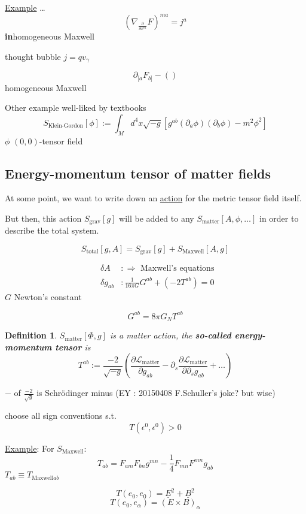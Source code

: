 \documentclass[10pt, twoside]{amsart}
\newtheorem{definition}{Definition}
\begin{document}
\begin{multicols*}{2}
\underline{Example} \dots 
\[
(\nabla_{\frac{ \partial }{ \partial x^m} }F)^{ma} = j^a
\]
\textbf{in}homogeneous Maxwell

thought bubble $j=qv_{\gamma}$

\[
\partial_{[a}F_{b]} - ()
\]
homogeneous Maxwell

Other example well-liked by textbooks
\[
S_{\text{Klein-Gordon}}[\phi] := \int_M d^4x \sqrt{-g}[g^{ab}(\partial_a \phi) (\partial_b \phi ) - m^2\phi^2]
\]
$\phi$ $(0,0)$-tensor field

\subsection{Energy-momentum tensor of matter fields}

At some point, we want to write down an \underline{action} for the metric tensor field itself.

But then, this action $S_{\text{grav}}[g]$ will be added to any $S_{\text{matter}}[A,\phi,\dots]$ in order to describe the total system.  

\[
S_{\text{total}}[g,A] = S_{\text{grav}}[g] + S_{\text{Maxwell}}[A,g]
\]

\[
\begin{aligned}
  & \delta A     & : \Longrightarrow \text{ Maxwell's equations } \\
  & \delta g_{ab} & : \boxed{ \frac{1}{ 16 \pi G } G^{ab} } + (-2T^{ab} ) = 0 
\end{aligned}
\]
$G$ Newton's constant

\[
G^{ab} = 8 \pi G_N T^{ab}
\]

\begin{definition}
$  S_{\text{matter}}[\Phi,g] $ is a matter action, the \textbf{so-called energy-momentum tensor} is 
\[
T^{ab} := \frac{-2}{ \sqrt{-g}} \left( \frac{ \partial \mathcal{L}_{\text{matter}} }{ \partial g_{ab}} - \partial_s \frac{ \partial \mathcal{L}_{\text{matter}} }{ \partial \partial_s g_{ab}} + \dots \right)
\]
\end{definition}
$-$ of $\frac{-2}{\sqrt{g}}$ is Schr\"{o}dinger minus (EY : 20150408 F.Schuller's joke? but wise)

choose all sign conventions s.t.
\[
T(\epsilon^0,\epsilon^0) >0
\]

\underline{Example}: For $S_{\text{Maxwell}}$:
\[
T_{ab} = F_{am} F_{bn}g^{mn} - \frac{1}{4} F_{mn} F^{mn} g_{ab}
\]
$T_{ab} \equiv T_{\text{Maxwell}ab}$

\[
T(e_0,e_0) = \underline{E}^2+\underline{B}^2
\]
\[
T(e_0,e_{\alpha}) = (E\times B)_{\alpha}
\]


\end{multicols*}
\end{document}
